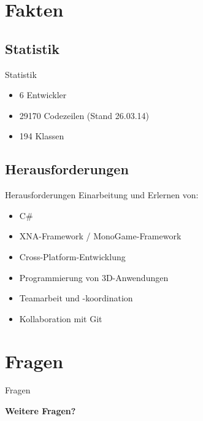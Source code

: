 \documentclass[18pt]{beamer}
\begin{document}
\section{Fakten}
\subsection{Statistik}
\begin{frame}{Statistik}
\begin{itemize}
\item 6 Entwickler
\item 29170 Codezeilen (Stand 26.03.14)
\item 194 Klassen
\end{itemize}
\end{frame}

\subsection{Herausforderungen}
\begin{frame} {Herausforderungen}
Einarbeitung und Erlernen von:
\begin{itemize}
\item C\#
\item XNA-Framework / MonoGame-Framework
\item Cross-Platform-Entwicklung
\item Programmierung von 3D-Anwendungen
\item Teamarbeit und -koordination
\item Kollaboration mit Git
\end{itemize}
\end{frame}


\section{Fragen}
\begin{frame}{Fragen}
\begin{center}
\Huge \textbf{Weitere Fragen?}
\end{center}
\end{frame}



%
%
\end{document}
